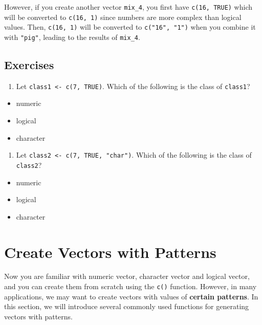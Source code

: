 \documentclass[
]{book}
\providecommand{\tightlist}{%
  \setlength{\itemsep}{0pt}\setlength{\parskip}{0pt}}
\begin{document}
However, if you create another vector \texttt{mix\_4}, you first have \texttt{c(16,\ TRUE)} which will be converted to \texttt{c(16,\ 1)} since numbers are more complex than logical values. Then, \texttt{c(16,\ 1)} will be converted to \texttt{c("16",\ "1")} when you combine it with \texttt{"pig"}, leading to the results of \texttt{mix\_4}.

\hypertarget{exercises-4}{%
\subsection{Exercises}\label{exercises-4}}

\begin{enumerate}
\def\labelenumi{\arabic{enumi}.}
\tightlist
\item
  Let \texttt{class1\ \textless{}-\ c(7,\ TRUE)}. Which of the following is the class of \texttt{class1}?
\end{enumerate}

\begin{itemize}
\tightlist
\item
  numeric
\item
  logical
\item
  character
\end{itemize}

\begin{enumerate}
\def\labelenumi{\arabic{enumi}.}
\setcounter{enumi}{1}
\tightlist
\item
  Let \texttt{class2\ \textless{}-\ c(7,\ TRUE,\ "char")}. Which of the following is the class of \texttt{class2}?
\end{enumerate}

\begin{itemize}
\tightlist
\item
  numeric
\item
  logical
\item
  character
\end{itemize}

\hypertarget{vector-patterns}{%
\section{Create Vectors with Patterns}\label{vector-patterns}}

Now you are familiar with numeric vector, character vector and logical vector, and you can create them from scratch using the \texttt{c()} function. However, in many applications, we may want to create vectors with values of \textbf{certain patterns}. In this section, we will introduce several commonly used functions for generating vectors with patterns.
\end{document}

